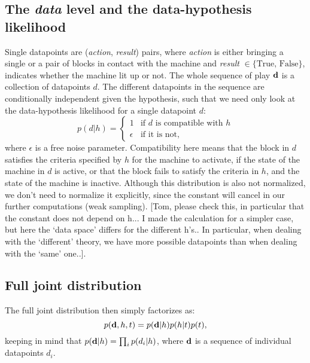 \documentclass[11pt, a4paper]{article}
\begin{document}
\subsection*{The \emph{data} level and the data-hypothesis likelihood}
Single datapoints are (\emph{action}, \emph{result}) pairs, where \emph{action} is either bringing a single or a pair of blocks in contact with the machine and \emph{result} $\in\{ \textrm{True, False} \}$, indicates whether the machine lit up or not. The whole sequence of play $\textbf d$ is a collection of datapoints $d$. The different datapoints in the sequence are conditionally independent given the hypothesis, such that we need only look at the data-hypothesis likelihood for a single datapoint $d$:
\begin{equation}
p(d|h)= 
\begin{cases} 
1  & \textrm{if $d$ is compatible with  $h$} \\
\epsilon &  \textrm{if it is not},
\end{cases}
\end{equation}
where $\epsilon$ is a free noise parameter. Compatibility here means that the block in $d$ satisfies the criteria specified by $h$ for the machine to activate, if the state of the machine in $d$ is active, or that the block fails to satisfy the criteria in $h$, and the state of the machine is inactive. Although this distribution is also not normalized, we don't need to normalize it explicitly, since the constant will cancel in our further computations (weak sampling). [Tom, please check this, in particular that the constant does not depend on h... I made the calculation for a simpler case, but here the `data space' differs for the different h's.. In particular, when dealing with the `different' theory, we have more possible datapoints than when dealing with the `same' one..]. 

\subsection*{Full joint distribution}
The full joint distribution then simply factorizes as:
\begin{equation}
p(\textbf d,h,t)=p(\textbf d |h)p(h|t)p(t),
\end{equation}
keeping in mind that $p(\textbf d |h)=\prod_i p(d_i |h)$, where $\textbf d$ is a sequence of individual datapoints $d_i$.
\end{document}
